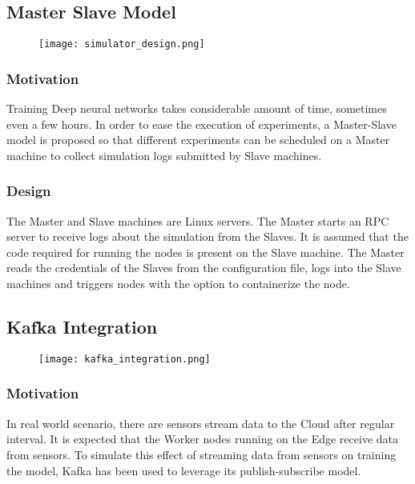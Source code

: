 \documentclass[a4paper, 12pt]{article}
\begin{document}
\subsection{Master Slave Model}
\begin{figure}[ht]
    \begin{center}
        \texttt{[image: simulator\_design.png]}
    \end{center}
\end{figure}

\subsubsection{Motivation}
Training Deep neural networks takes considerable amount of time, sometimes even a few hours. In order to ease the execution of experiments, a Master-Slave model is proposed so that different experiments can be scheduled on a Master machine to collect simulation logs submitted by Slave machines.
\subsubsection{Design}
The Master and Slave machines are Linux servers. The Master starts an RPC server to receive logs about the simulation from the Slaves. It is assumed that the code required for running the nodes is present on the Slave machine. The Master reads the credentials of the Slaves from the configuration file, logs into the Slave machines and triggers nodes with the option to containerize the node. 

\subsection{Kafka Integration}
\begin{figure}[ht]
    \begin{center}
        \texttt{[image: kafka\_integration.png]}
    \end{center}
\end{figure}
\subsubsection{Motivation}
In real world scenario, there are sensors stream data to the Cloud after regular interval. It is expected that the Worker nodes running on the Edge receive data from sensors. To simulate this effect of streaming data from sensors on training the model, Kafka has been used to leverage its publish-subscribe model. 
\end{document}
